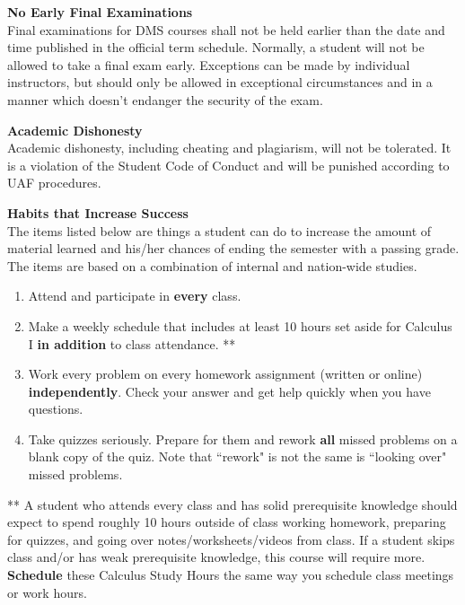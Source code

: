 \documentclass[12pt]{article}
\renewcommand{\emph}[1]{\textsf{\textbf{#1}}}
\newcommand{\localhead}[1]{\par\smallskip\textbf{#1}\nobreak\\}%
\def\heading#1{\localhead{\large\emph{#1}}}
\def\subheading#1{\localhead{\emph{#1}}}
\begin{document}
\subheading{No Early Final Examinations}
Final examinations for DMS courses shall not be held earlier than the date and time published in the official term schedule. Normally, a student will not be allowed to take a final exam early. Exceptions can be made by individual instructors, but should only be allowed in exceptional circumstances and in a manner which doesn't endanger the security of the exam.

\subheading{Academic Dishonesty}
Academic dishonesty, including cheating and plagiarism, will not be tolerated.  It is a violation of the Student Code of Conduct and will be punished according to UAF procedures.

\heading{Habits that Increase Success}
The items listed below are things a student can do to increase the amount of material learned and his/her chances of ending the semester with a passing grade. The items are based on a combination of internal and nation-wide studies.
\begin{enumerate}
\item Attend and participate in {\emph{every}} class. 
\item Make a weekly schedule that includes at least 10 hours set aside for Calculus I \emph{in addition} to class attendance. **
\item Work every problem on every homework assignment (written or online) \textbf{independently}. Check your answer and get help quickly when you have questions.
\item Take quizzes seriously. Prepare for them and rework \emph{all} missed problems on a blank copy of the quiz. Note that  ``rework" is not the same is ``looking over" missed problems.   \end{enumerate}
** A student who attends every class and has solid prerequisite knowledge should expect to spend roughly 10 hours outside of class working homework, preparing for quizzes, and going over notes/worksheets/videos from class. If a student skips class and/or has weak prerequisite knowledge, this course will require more. \textbf{Schedule} these Calculus Study Hours the same way you schedule class meetings or work hours.
\end{document}
